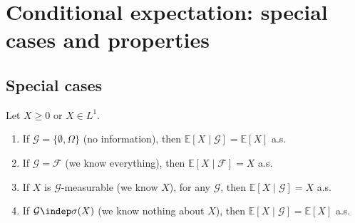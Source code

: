 \section{Conditional expectation: special cases and properties}\label{sec:cp-properties}

\subsection{Special cases}\label{sec:cp-special-cases}

\begin{proposition}\label{prop:cp-special-cases}
Let $X\ge0$ or $X\in L^1$.
\begin{enumerate}[label=\arabic*)]
  \item If $\mathcal G=\{\emptyset,\Omega\}$ (no information), then $\mathbb E[X\mid\mathcal G]=\mathbb E[X]$ a.s.
  \item If $\mathcal G=\mathcal F$ (we know everything), then $\mathbb E[X\mid\mathcal F]=X$ a.s.
  \item If $X$ is $\mathcal G$-measurable (we know $X$), for any $\mathcal G$, then
    $\mathbb E[X\mid\mathcal G]=X$ a.s.
  \item If $\mathcal G\indep\sigma(X)$ (we know nothing about $X$), then
    $\mathbb E[X\mid\mathcal G]=\mathbb E[X]$ a.s.
\end{enumerate}
\end{proposition}

